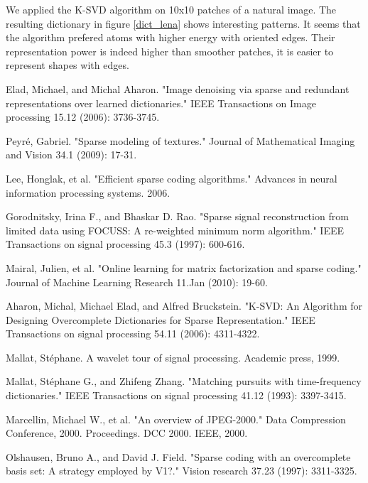 \documentclass[a4paper,11pt]{article}
\begin{document}
We applied the K-SVD algorithm on 10x10 patches of a natural image.
The resulting dictionary in figure \ref{dict_lena} shows interesting patterns.
It seems that the algorithm prefered atoms with higher energy with oriented edges.
Their representation power is indeed higher than smoother patches, it is easier to represent shapes with edges.

\begin{thebibliography}{9}

Elad, Michael, and Michal Aharon. "Image denoising via sparse and redundant representations over learned dictionaries." IEEE Transactions on Image processing 15.12 (2006): 3736-3745.

Peyré, Gabriel. "Sparse modeling of textures." Journal of Mathematical Imaging and Vision 34.1 (2009): 17-31.

Lee, Honglak, et al. "Efficient sparse coding algorithms." Advances in neural information processing systems. 2006.

Gorodnitsky, Irina F., and Bhaskar D. Rao. "Sparse signal reconstruction from limited data using FOCUSS: A re-weighted minimum norm algorithm." IEEE Transactions on signal processing 45.3 (1997): 600-616.

Mairal, Julien, et al. "Online learning for matrix factorization and sparse coding." Journal of Machine Learning Research 11.Jan (2010): 19-60.

Aharon, Michal, Michael Elad, and Alfred Bruckstein. "K-SVD: An Algorithm for Designing Overcomplete Dictionaries for Sparse Representation." IEEE Transactions on signal processing 54.11 (2006): 4311-4322.

Mallat, Stéphane. A wavelet tour of signal processing. Academic press, 1999.

Mallat, Stéphane G., and Zhifeng Zhang. "Matching pursuits with time-frequency dictionaries." IEEE Transactions on signal processing 41.12 (1993): 3397-3415.

Marcellin, Michael W., et al. "An overview of JPEG-2000." Data Compression Conference, 2000. Proceedings. DCC 2000. IEEE, 2000.

Olshausen, Bruno A., and David J. Field. "Sparse coding with an overcomplete basis set: A strategy employed by V1?." Vision research 37.23 (1997): 3311-3325.


\end{thebibliography}
\end{document}
